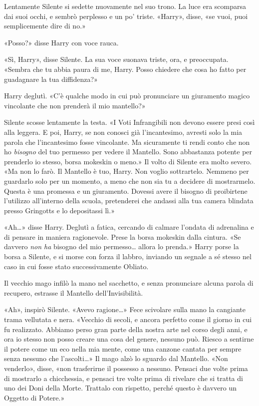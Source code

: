 Lentamente Silente si sedette nuovamente nel suo trono. La luce era scomparsa dai suoi occhi, e sembrò perplesso e un po’ triste. «Harry», disse, «se vuoi, puoi semplicemente dire di no.»

«Posso?» disse Harry con voce rauca.

«Sì, Harry», disse Silente. La sua voce suonava triste, ora, e preoccupata. «Sembra che tu abbia paura di me, Harry. Posso chiedere che cosa ho fatto per guadagnare la tua diffidenza?»

Harry deglutì. «C’è qualche modo in cui può pronunciare un giuramento magico vincolante che non prenderà il mio mantello?»

Silente scosse lentamente la testa. «I Voti Infrangibili non devono essere presi così alla leggera. E poi, Harry, se non conosci già l’incantesimo, avresti solo la mia parola che l’incantesimo fosse vincolante. Ma sicuramente ti rendi conto che non ho \textit{bisogno} del tuo permesso per vedere il Mantello. Sono abbastanza potente per prenderlo io stesso, borsa mokeskin o meno.» Il volto di Silente era molto severo. «Ma non lo farò. Il Mantello è tuo, Harry. Non voglio sottrartelo. Nemmeno per guardarlo solo per un momento, a meno che non sia tu a decidere di mostrarmelo. Questa è una promessa e un giuramento. Dovessi avere il bisogno di proibirtene l’utilizzo all’interno della scuola, pretenderei che andassi alla tua camera blindata presso Gringotts e lo depositassi lì.»

«Ah…» disse Harry. Deglutì a fatica, cercando di calmare l’ondata di adrenalina e di pensare in maniera ragionevole. Prese la borsa mokeskin dalla cintura. «Se davvero \textit{non ha} bisogno del mio permesso… allora lo prenda.» Harry porse la borsa a Silente, e si morse con forza il labbro, inviando un segnale a sé stesso nel caso in cui fosse stato successivamente Obliato.

Il vecchio mago infilò la mano nel sacchetto, e senza pronunciare alcuna parola di recupero, estrasse il Mantello dell’Invisibilità.

«Ah», inspirò Silente. «Avevo ragione…» Fece scivolare sulla mano la cangiante trama vellutata e nera. «Vecchio di secoli, e ancora perfetto come il giorno in cui fu realizzato. Abbiamo perso gran parte della nostra arte nel corso degli anni, e ora io stesso non posso creare una cosa del genere, nessuno può. Riesco a sentirne il potere come un eco nella mia mente, come una canzone cantata per sempre senza nessuno che l’ascolti…» Il mago alzò lo sguardo dal Mantello. «Non venderlo», disse, «non trasferirne il possesso a nessuno. Pensaci due volte prima di mostrarlo a chicchessia, e pensaci tre volte prima di rivelare che si tratta di uno dei Doni della Morte. Trattalo con rispetto, perché questo è davvero un Oggetto di Potere.»

